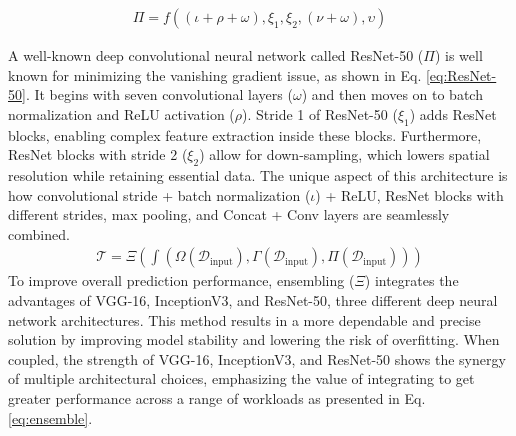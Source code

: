 \documentclass[10pt, conference, a4paper, compsocconf]{IEEEtran}
\begin{document}
\begin{equation}\label{eq:ResNet-50}
    \begin{aligned}
        \Pi = f((\iota+\rho+\omega),\xi_{1},\xi_{2},(\nu+\omega),\upsilon)
    \end{aligned}
\end{equation}

\indent A well-known deep convolutional neural network called ResNet-50 ($\Pi$) is well known for minimizing the vanishing gradient issue, as shown in Eq. \ref{eq:ResNet-50}.  It begins with seven convolutional layers ($\omega$) and then moves on to batch normalization and ReLU activation ($\rho$). Stride 1 of ResNet-50 ($\xi_{1}$) adds ResNet blocks, enabling complex feature extraction inside these blocks. Furthermore, ResNet blocks with stride 2 ($\xi_{2}$) allow for down-sampling, which lowers spatial resolution while retaining essential data. The unique aspect of this architecture is how convolutional stride + batch normalization ($\iota$) + ReLU, ResNet blocks with different strides, max pooling, and Concat + Conv layers are seamlessly combined.
\begin{equation}\label{eq:ensemble}
    \begin{aligned}
        \mathcal{T} = \Xi (\int (\Omega(\mathcal{D}_{\text{input}}),\Gamma(\mathcal{D}_{\text{input}}),\Pi(\mathcal{D}_{\text{input}})))
    \end{aligned}
\end{equation}
\indent To improve overall prediction performance, ensembling ($\Xi$) integrates the advantages of VGG-16, InceptionV3, and ResNet-50, three different deep neural network architectures.  This method results in a more dependable and precise solution by improving model stability and lowering the risk of overfitting. When coupled, the strength of VGG-16, InceptionV3, and ResNet-50 shows the synergy of multiple architectural choices, emphasizing the value of integrating to get greater performance across a range of workloads as presented in Eq. \ref{eq:ensemble}.
\end{document}
